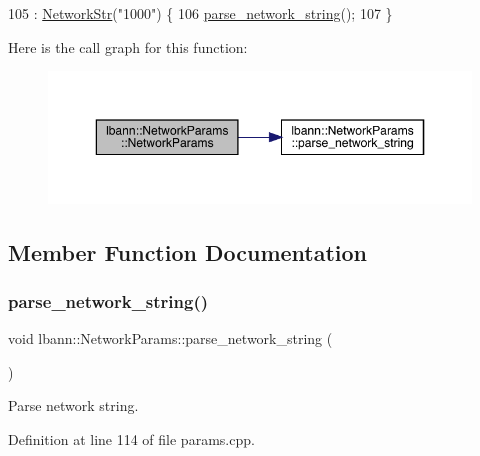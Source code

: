 \begin{DoxyCode}
105                                   : \hyperlink{classlbann_1_1NetworkParams_a8b503690c7475582b5a843f0959c3f2a}{NetworkStr}(\textcolor{stringliteral}{"1000"}) \{
106   \hyperlink{classlbann_1_1NetworkParams_a14954fcbacb6c9522bd3cf6c28bc93d5}{parse\_network\_string}();
107 \}
\end{DoxyCode}
Here is the call graph for this function\+:\nopagebreak
\begin{figure}[H]
\begin{center}
\leavevmode
\includegraphics[width=350pt]{classlbann_1_1NetworkParams_ad915e046e5e001f37a5d0124809dd07b_cgraph}
\end{center}
\end{figure}


\subsection{Member Function Documentation}
\mbox{\label{classlbann_1_1NetworkParams_a14954fcbacb6c9522bd3cf6c28bc93d5}} 
\subsubsection{\texorpdfstring{parse\+\_\+network\+\_\+string()}{parse\_network\_string()}}
{\footnotesize\ttfamily void lbann\+::\+Network\+Params\+::parse\+\_\+network\+\_\+string (\begin{DoxyParamCaption}{ }\end{DoxyParamCaption})\hspace{0.3cm}{\ttfamily [private]}}



Parse network string. 



Definition at line 114 of file params.\+cpp.


